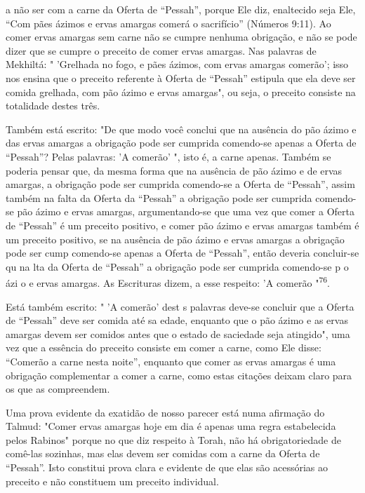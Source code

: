 a não ser com a carne da Oferta de ``Pessah'', porque Ele diz, enaltecido
seja Ele, ``Com pães ázimos e ervas amargas comerá o sacrifício'' (Números
9:11). Ao comer ervas amargas sem carne não se cumpre nenhuma obrigação,
e não se pode dizer que se cumpre o preceito de comer ervas amargas. Nas
palavras de Mekhiltá: " 'Grelhada no fogo, e pães ázimos, com ervas
amargas comerão'; isso nos ensina que o preceito referente à Oferta de
``Pessah'' estipula que ela deve ser comida grelhada, com pão ázimo e
ervas amargas", ou seja, o preceito consiste na totalidade destes três.

Também está escrito: "De que modo você conclui que na ausência do pão
ázimo e das ervas amargas a obrigação pode ser cumprida comendo-se
apenas a Oferta de ``Pessah''? Pelas palavras: 'A comerão' ", isto é, a
carne ape­nas. Também se poderia pensar que, da mesma forma que na
ausência de pão ázimo e de ervas amargas, a obrigação pode ser cumprida
comendo-se a Oferta de ``Pessah'', assim também na falta da Oferta da
``Pessah'' a obrigação pode ser cumprida comendo-se pão ázimo e ervas
amargas, argumentando-se que uma vez que comer a Oferta de ``Pessah'' é um
preceito positivo, e comer pão ázi­mo e ervas amargas também é um
preceito positivo, se na ausência de pão ázi­mo e ervas amargas a
obrigação pode ser cump comendo-se apenas a Ofer­ta de ``Pessah'', então
deveria concluir-se qu na lta da Oferta de ``Pessah'' a obrigação pode ser
cumprida comendo-se p o ázi o e ervas amargas. As Es­crituras dizem, a
esse respeito: 'A comerão "\textsuperscript{76}.

Está também escrito: " 'A comerão' dest s palavras deve-se concluir que
a Oferta de ``Pessah'' deve ser comida até sa edade, enquanto que o pão
ázimo e as ervas amargas devem ser comidos antes que o estado de
saciedade seja atingido", uma vez que a essência do preceito consiste em
comer a carne, como Ele disse: ``Comerão a carne nesta noite'', enquanto
que comer as ervas amargas é uma obrigação complementar a comer a carne,
como estas citações deixam claro para os que as compreendem.

Uma prova evidente da exatidão de nosso parecer está numa afirma­ção do
Talmud: "Comer ervas amargas hoje em dia é apenas uma regra
estabe­lecida pelos Rabinos" porque no que diz respeito à Torah, não há
obrigatorie­dade de comê-las sozinhas, mas elas devem ser comidas com a
carne da Oferta de ``Pessah''. Isto constitui prova clara e evidente de
que elas são acessórias ao preceito e não constituem um preceito
individual.


